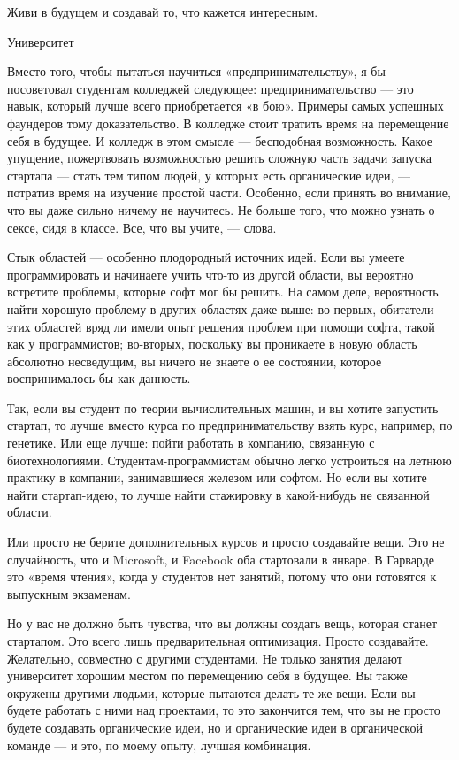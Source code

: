 \documentclass[ebook,12pt,oneside,openany]{memoir}
\begin{document}
Живи в будущем и создавай то, что кажется интересным.

Университет

Вместо того, чтобы пытаться научиться «предпринимательству», я бы
посоветовал студентам колледжей следующее: предпринимательство — это
навык, который лучше всего приобретается «в бою». Примеры самых
успешных фаундеров тому доказательство. В колледже стоит тратить время
на перемещение себя в будущее. И колледж в этом смысле — бесподобная
возможность. Какое упущение, пожертвовать возможностью решить сложную
часть задачи запуска стартапа — стать тем типом людей, у которых есть
органические идеи, — потратив время на изучение простой части.
Особенно, если принять во внимание, что вы даже сильно ничему не
научитесь. Не больше того, что можно узнать о сексе, сидя в классе.
Все, что вы учите, — слова.

Стык областей — особенно плодородный источник идей. Если вы умеете
программировать и начинаете учить что-то из другой области, вы
вероятно встретите проблемы, которые софт мог бы решить. На самом
деле, вероятность найти хорошую проблему в других областях даже выше:
во-первых, обитатели этих областей вряд ли имели опыт решения проблем
при помощи софта, такой как у программистов; во-вторых, поскольку вы
проникаете в новую область абсолютно несведущим, вы ничего не знаете о
ее состоянии, которое воспринималось бы как данность.

Так, если вы студент по теории вычислительных машин, и вы хотите
запустить стартап, то лучше вместо курса по предпринимательству взять
курс, например, по генетике. Или еще лучше: пойти работать в компанию,
связанную с биотехнологиями. Студентам-программистам обычно легко
устроиться на летнюю практику в компании, занимавшиеся железом или
софтом. Но если вы хотите найти стартап-идею, то лучше найти
стажировку в какой-нибудь не связанной области.

Или просто не берите дополнительных курсов и просто создавайте вещи.
Это не случайность, что и Microsoft, и Facebook оба стартовали в
январе. В Гарварде это «время чтения», когда у студентов нет занятий,
потому что они готовятся к выпускным экзаменам.

Но у вас не должно быть чувства, что вы должны создать вещь, которая
станет стартапом. Это всего лишь предварительная оптимизация. Просто
создавайте. Желательно, совместно с другими студентами. Не только
занятия делают университет хорошим местом по перемещению себя в
будущее. Вы также окружены другими людьми, которые пытаются делать те
же вещи. Если вы будете работать с ними над проектами, то это
закончится тем, что вы не просто будете создавать органические идеи,
но и органические идеи в органической команде — и это, по моему опыту,
лучшая комбинация.
\end{document}
